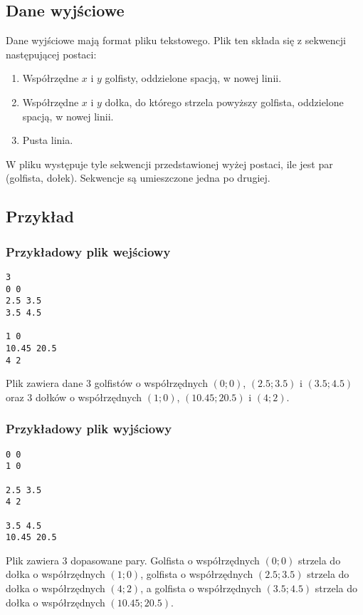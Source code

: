 \documentclass{article}
\begin{document}
\subsection{Dane wyjściowe}
Dane wyjściowe mają format pliku tekstowego. Plik ten składa się z sekwencji następującej postaci:
\begin{enumerate}
\item Współrzędne $x$ i $y$ golfisty, oddzielone spacją, w nowej linii.
\item Współrzędne $x$ i $y$ dołka, do którego strzela powyższy golfista, oddzielone spacją, w nowej linii.
\item Pusta linia.
\end{enumerate}
W pliku występuje tyle sekwencji przedstawionej wyżej postaci, ile jest par (golfista, dołek). Sekwencje są umieszczone jedna po drugiej.

\subsection{Przykład}

\subsubsection{Przykładowy plik wejściowy}

\lstset{
numbers=left,
frame=single
}
\begin{lstlisting}
3
0 0
2.5 3.5
3.5 4.5

1 0
10.45 20.5
4 2
\end{lstlisting}
Plik zawiera dane 3 golfistów o współrzędnych $(0; 0)$, $(2.5; 3.5)$ i $(3.5; 4.5)$ oraz 3 dołków o współrzędnych $(1; 0)$, $(10.45; 20.5)$ i $(4; 2)$.

\subsubsection{Przykładowy plik wyjściowy}
\begin{lstlisting}
0 0
1 0

2.5 3.5
4 2

3.5 4.5
10.45 20.5

\end{lstlisting}
Plik zawiera 3 dopasowane pary. Golfista o współrzędnych $(0; 0)$ strzela do dołka o współrzędnych $(1; 0)$, golfista o współrzędnych $(2.5; 3.5)$ strzela do dołka o współrzędnych $(4; 2)$, a golfista o współrzędnych $(3.5; 4.5)$ strzela do dołka o współrzędnych $(10.45; 20.5)$.

\newpage
\end{document}

